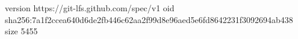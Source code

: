 version https://git-lfs.github.com/spec/v1
oid sha256:7a1f2ccea640d6de2fb446c62aa2f99d8e96aed5e6fd8642231f3092694ab438
size 5455
